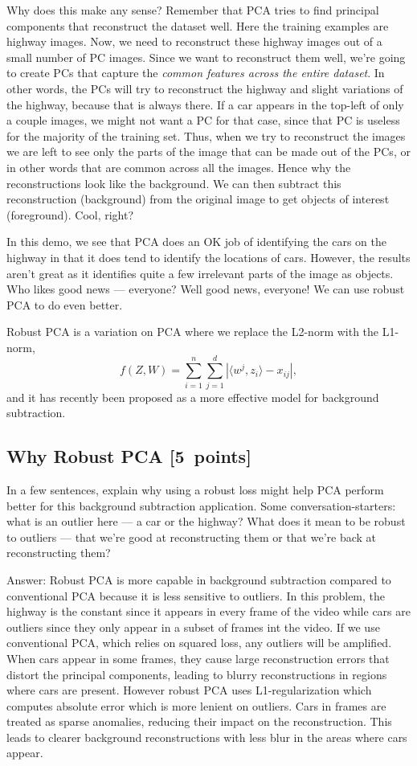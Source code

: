 \documentclass{article}
\newcommand{\blu}[1]{{\textcolor{blu}{#1}}}
\newcommand{\gre}[1]{\textcolor{gre}{#1}}
\newcommand\ans[1]{\par\gre{Answer: #1}}
\let\ask\blu
\newcommand\pts[1]{\textcolor{pointscolour}{[#1~points]}}
\begin{document}
Why does this make any sense? Remember that PCA tries to find principal components that reconstruct the dataset well. Here the training examples are highway images. Now, we need to reconstruct these highway images out of a small number of PC images. Since we want to reconstruct them well, we're going to create PCs that capture the \emph{common features across the entire dataset}. In other words, the PCs will try to reconstruct the highway and slight variations of the highway, because that is always there. If a car appears in the top-left of only a couple images, we might not want a PC for that case, since that PC is useless for the majority of the training set. Thus, when we try to reconstruct the images we are left to see only the parts of the image that can be made out of the PCs, or in other words that are common across all the images. Hence why the reconstructions look like the background. We can then subtract this reconstruction (background) from the original image to get objects of interest (foreground). Cool, right?

In this demo, we see that PCA does an OK job of identifying the cars on the highway in that it does tend to identify the locations of cars. However, the results aren't great as it identifies quite a few irrelevant parts of the image as objects. Who likes good news --- everyone? Well good news, everyone! We can use robust PCA to do even better.

Robust PCA is a variation on PCA where we replace the L2-norm with the L1-norm,
\[
f(Z,W) = \sum_{i=1}^n\sum_{j=1}^d |\langle w^j, z_i\rangle - x_{ij}|,
\]
and it has recently been proposed as a more effective model for background subtraction.

\subsection{Why Robust PCA \pts{5}}

\ask{In a few sentences, explain why using a robust loss might help PCA perform better for this background subtraction application.} Some conversation-starters: what is an outlier here --- a car or the highway? What does it mean to be robust to outliers --- that we're good at reconstructing them or that we're back at reconstructing them?

\ans{ Robust PCA is more capable in background subtraction compared to conventional PCA because it is less sensitive to outliers. In this problem, the highway is the constant since it appears in every frame of the video while cars are outliers since they only appear in a subset of frames int the video. If we use conventional PCA, which relies on squared loss, any outliers will be amplified. When cars appear in some frames, they cause large reconstruction errors that distort the principal components, leading to blurry reconstructions in regions where cars are present. However robust PCA uses L1-regularization which computes absolute error which is more lenient on outliers. Cars in frames are treated as sparse anomalies, reducing their impact on the reconstruction. This leads to clearer background reconstructions with less blur in the areas where cars appear. }
\newpage
\end{document}
